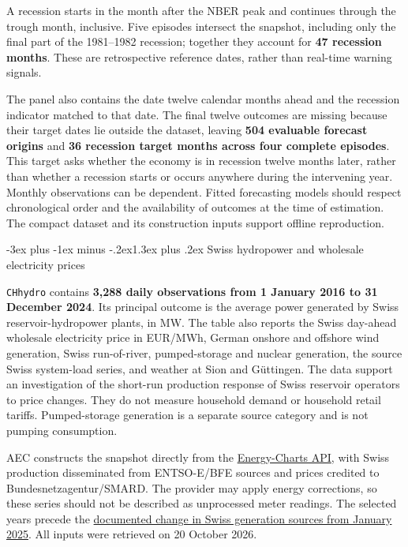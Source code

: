 \documentclass[
  11pt,
]{book}
\makeatletter
\renewcommand\section{\@startsection{section}{1}{\z@}
  {-3ex plus -1ex minus -.2ex}{1.3ex plus .2ex}
  {\normalfont\Large\bfseries\color{TextbookInk}}}
\theoremstyle{definition}
\theoremstyle{definition}
\theoremstyle{definition}
\theoremstyle{definition}
\theoremstyle{remark}
\makeatother
\begin{document}
A recession starts in the month after the NBER peak and continues through the trough month, inclusive. Five episodes intersect the snapshot, including only the final part of the 1981--1982 recession; together they account for \textbf{47 recession months}. These are retrospective reference dates, rather than real-time warning signals.

The panel also contains the date twelve calendar months ahead and the recession indicator matched to that date. The final twelve outcomes are missing because their target dates lie outside the dataset, leaving \textbf{504 evaluable forecast origins} and \textbf{36 recession target months across four complete episodes}. This target asks whether the economy is in recession twelve months later, rather than whether a recession starts or occurs anywhere during the intervening year. Monthly observations can be dependent. Fitted forecasting models should respect chronological order and the availability of outcomes at the time of estimation. The compact dataset and its construction inputs support offline reproduction.

\section{Swiss hydropower and wholesale electricity prices}\label{data-hydro}

\texttt{CHhydro} contains \textbf{3,288 daily observations from 1 January 2016 to 31 December 2024}. Its principal outcome is the average power generated by Swiss reservoir-hydropower plants, in MW. The table also reports the Swiss day-ahead wholesale electricity price in EUR/MWh, German onshore and offshore wind generation, Swiss run-of-river, pumped-storage and nuclear generation, the source Swiss system-load series, and weather at Sion and Güttingen. The data support an investigation of the short-run production response of Swiss reservoir operators to price changes. They do not measure household demand or household retail tariffs. Pumped-storage generation is a separate source category and is not pumping consumption.

AEC constructs the snapshot directly from the \href{https://api.energy-charts.info/}{Energy-Charts API}, with Swiss production disseminated from ENTSO-E/BFE sources and prices credited to Bundesnetzagentur/SMARD. The provider may apply energy corrections, so these series should not be described as unprocessed meter readings. The selected years precede the \href{https://energy-charts.info/charts/power/chart.htm?c=CH&l=en}{documented change in Swiss generation sources from January 2025}. All inputs were retrieved on 20 October 2026.
\end{document}
